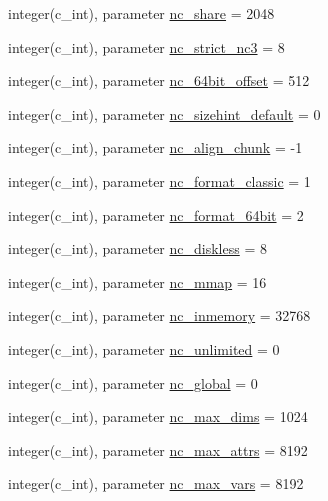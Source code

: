 \begin{DoxyCompactItemize}
\item 
integer(c\+\_\+int), parameter \hyperlink{namespacenetcdf__nc__data_af9e4915085fa53a31b8abefaa2777261}{nc\+\_\+share} = 2048
\item 
integer(c\+\_\+int), parameter \hyperlink{namespacenetcdf__nc__data_a6d9e01060b38ab924ba20551f7dbfa60}{nc\+\_\+strict\+\_\+nc3} = 8
\item 
integer(c\+\_\+int), parameter \hyperlink{namespacenetcdf__nc__data_a7c5ba5f8ee469226a3292f7455822486}{nc\+\_\+64bit\+\_\+offset} = 512
\item 
integer(c\+\_\+int), parameter \hyperlink{namespacenetcdf__nc__data_ad6e4c122a6ffd511178598b1447c21a5}{nc\+\_\+sizehint\+\_\+default} = 0
\item 
integer(c\+\_\+int), parameter \hyperlink{namespacenetcdf__nc__data_a1c065ce771c3dceae59ab9d8b14d2d09}{nc\+\_\+align\+\_\+chunk} = -\/1
\item 
integer(c\+\_\+int), parameter \hyperlink{namespacenetcdf__nc__data_ae9cc945abafec8eb23d5f584342d3aa3}{nc\+\_\+format\+\_\+classic} = 1
\item 
integer(c\+\_\+int), parameter \hyperlink{namespacenetcdf__nc__data_a986b9f17c6b9d448234be36983851f89}{nc\+\_\+format\+\_\+64bit} = 2
\item 
integer(c\+\_\+int), parameter \hyperlink{namespacenetcdf__nc__data_ac35e829ff86d95f09db687f1c34a5d50}{nc\+\_\+diskless} = 8
\item 
integer(c\+\_\+int), parameter \hyperlink{namespacenetcdf__nc__data_acd96905f0345296902806ac08859f757}{nc\+\_\+mmap} = 16
\item 
integer(c\+\_\+int), parameter \hyperlink{namespacenetcdf__nc__data_a6590b555133bf817e31e28aee20f9393}{nc\+\_\+inmemory} = 32768
\item 
integer(c\+\_\+int), parameter \hyperlink{namespacenetcdf__nc__data_a81d34a59d48d58dcb6e72304443038de}{nc\+\_\+unlimited} = 0
\item 
integer(c\+\_\+int), parameter \hyperlink{namespacenetcdf__nc__data_a541ff616daf713edea81d32a329af406}{nc\+\_\+global} = 0
\item 
integer(c\+\_\+int), parameter \hyperlink{namespacenetcdf__nc__data_a2e819b1ec79c2dd57227691eaccb011e}{nc\+\_\+max\+\_\+dims} = 1024
\item 
integer(c\+\_\+int), parameter \hyperlink{namespacenetcdf__nc__data_afcf42d5e37015eb623102b786b415afd}{nc\+\_\+max\+\_\+attrs} = 8192
\item 
integer(c\+\_\+int), parameter \hyperlink{namespacenetcdf__nc__data_ad4d20ce818b6e0acf0b12e8b06ecdb60}{nc\+\_\+max\+\_\+vars} = 8192

\end{DoxyCompactItemize}
